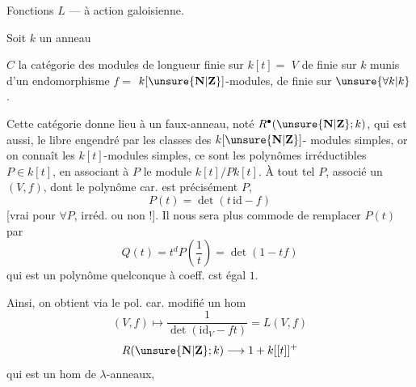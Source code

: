 \qquad Fonctions $L$ ---  à
\hfill action galoisienne.

Soit $k$ un  anneau

$C$ la catégorie des modules de longueur
finie sur $k[t]=$  $V$ 
de  finie sur
$k$ munis d'un endomorphisme $f=$
$k[\unsure{\mathbf N|\mathbf Z}]$-modules, de  finie sur $\unsure{\forall k|k}$.

Cette catégorie donne lieu à un faux-anneau,
noté $R^\bullet(\unsure{\mathbf N|\mathbf Z};k)$, qui est aussi, 
le  
libre engendré par les classes des $k[\unsure{\mathbf N|\mathbf Z}]$-
modules simples,  or on connaît les $k[t]$-modules
simples, ce sont les polynômes  irréductibles
$P\in k[t]$, en associant à $P$ le module
$k[t]/Pk[t]$. À tout tel $P$,  associé 
un $(V,f)$, dont le polynôme car. est
précisément $P$,
\[
P(t)=\det(t\,\mathrm{id}-f)
\]
[vrai pour $\forall P$, irréd. ou non !]. Il nous sera
plus commode de remplacer $P(t)$ par
\[
Q(t)=t^dP\left(\frac1t\right)=\det(1-tf)
\]
qui est un polynôme quelconque à coeff. cst égal $1$.

Ainsi, on obtient via le pol. car. modifié un
hom
\[
(V,f)\longmapsto\frac1{\det(\mathrm{id}_V-ft)}=L(V,f)
\]
\[
R(\unsure{\mathbf N|\mathbf Z};k)\longrightarrow 1+k[[t]]^+
\]
qui est un hom de $\lambda$-anneaux,

